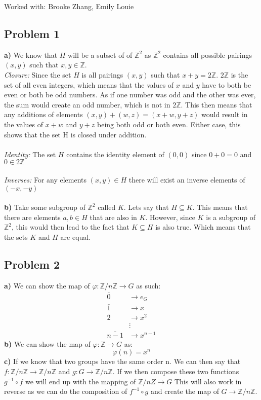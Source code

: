 \documentclass[12pt]{article}
\newcommand{\Z}{\mathbb{Z}}
\begin{document}
Worked with: Brooke Zhang, Emily Louie
\subsection*{Problem 1}
\textbf{a) } We know that $H$ will be a subset of of $\Z^2$ as $\Z^2$ contains all possible pairings $(x,y)$ such that $x,y \in \Z$.\\
\textit{Closure:} Since the set $H$ is all pairings $(x,y)$ such that $x + y = 2\Z$. $2\Z$ is the set of all even integers, which means that the values of $x$ and $y$ have to both be even or both be odd numbers. As if one number was odd and the other was ever, the sum would create an odd number, which is not in $2\Z$. This then means that any additions of elements $(x,y) + (w,z) = (x+w, y+z)$ would result in the values of $x+w$ and $y+z$ being both odd or both even. Either case, this shows that the set H is closed under addition.\\\\
\textit{Identity:} The set $H$ contains the identity element of $(0,0)$ since $0 + 0 = 0$ and $0 \in 2\Z$ \\\\
\textit{Inverses:} For any elements $(x,y) \in H$ there will exist an inverse elements of $(-x,-y)$\\\\
\textbf{b) } Take some subgroup of $\Z^2$ called $K$. Lets say that $H \subseteq	K$. This means that there are elements $a,b \in H$ that are also in $K$. However, since $K$ is a subgroup of $\Z^2$, this would then lead to the fact that $K \subseteq H$ is also true. Which means that the sets $K$ and $H$ are equal.
\subsection*{Problem 2}
\textbf{a) } We can show the map of $\varphi: \Z/n\Z \rightarrow G$ as such:
\begin{align*}
	\bar{0} &\rightarrow e_G \\
	\bar{1} &\rightarrow x \\
	\bar{2} &\rightarrow x^2 \\
	&\vdots \\
	\overline{n-1} &\rightarrow x^{n-1}
\end{align*}
\textbf{b) } We can show the map of $\varphi: \Z \rightarrow G$ as:
\[ \varphi(n) = x^n \]
\textbf{c) } If we know that two groups have the same order n. We can then say that $f:\Z/n\Z \rightarrow \Z/n\Z$ and $g: G \rightarrow \Z/n\Z$. If we then compose these two functions $g^{-1} \circ f$ we will end up with the mapping of $\Z/nZ \rightarrow G$ This will also work in reverse as we can do the composition of $f^{-1} \circ g$ and create the map of $G \rightarrow \Z/n\Z$.
\newpage
\end{document}
